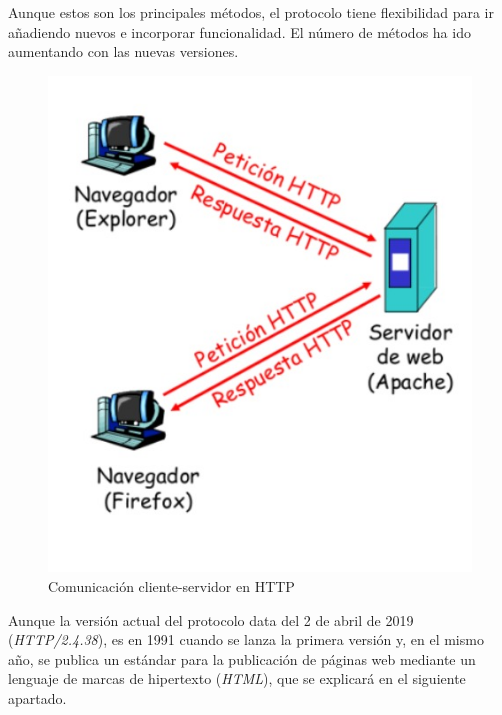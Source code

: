 Aunque estos son los principales métodos, el protocolo tiene flexibilidad para ir añadiendo nuevos e incorporar funcionalidad. El número de métodos ha ido aumentando con las nuevas versiones. 
\begin{figure}[h]
\centering
\includegraphics[scale=0.4]{img/http.jpeg}
\caption{Comunicación cliente-servidor en HTTP} \label{fig:http}
\end{figure}

Aunque la versión actual del protocolo data del 2 de abril de 2019 (\textit{HTTP/2.4.38}), es en 1991 cuando se lanza la primera versión y, en el mismo año, se publica un estándar para la publicación de páginas web mediante un lenguaje de marcas de hipertexto (\textit{HTML}), que se explicará en el siguiente apartado. 

